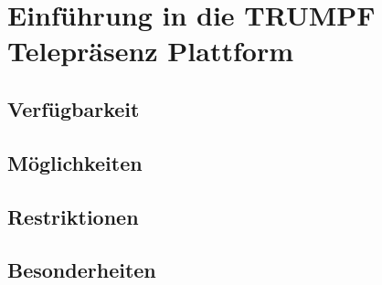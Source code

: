 \chapter{Einführung in die TRUMPF Telepräsenz Plattform}
\section{Verfügbarkeit}
\section{Möglichkeiten}
\section{Restriktionen}
\section{Besonderheiten}